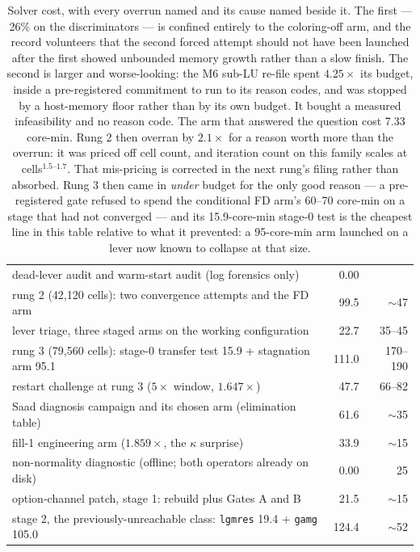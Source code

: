 \documentclass[11pt,a4paper]{article}
\begin{document}
\begin{table}[htbp]
\begin{tabular}{@{}L{7.0cm}rr@{}}
\quad dead-lever audit and warm-start audit (log forensics only) & 0.00 & \\
\quad rung 2 (42{,}120 cells): two convergence attempts and the FD arm & 99.5 & $\sim$47 \\
\quad lever triage, three staged arms on the working configuration & 22.7 & 35--45 \\
\quad rung 3 (79{,}560 cells): stage-0 transfer test 15.9 + stagnation arm 95.1 & 111.0 & 170--190 \\
\quad restart challenge at rung 3 (\(5\times\) window, \(1.647\times\)) & 47.7 & 66--82 \\
\quad Saad diagnosis campaign and its chosen arm (elimination table) & 61.6 & $\sim$35 \\
\quad fill-1 engineering arm (\(1.859\times\), the \(\kappa\) surprise) & 33.9 & $\sim$15 \\
\quad non-normality diagnostic (offline; both operators already on disk) & 0.00 & 25 \\
\quad option-channel patch, stage 1: rebuild plus Gates A and B & 21.5 & $\sim$15 \\
\quad stage 2, the previously-unreachable class: \texttt{lgmres} 19.4 + \texttt{gamg} 105.0 & 124.4 & $\sim$52 \\
\bottomrule
\end{tabular}
\caption{Solver cost, with every overrun named and its cause named beside it. The first --- 26\% on the discriminators --- is confined
entirely
to the coloring-off arm, and the record volunteers that the second forced attempt should not
have been launched after the first showed unbounded memory growth rather than a slow finish.
The second is larger and worse-looking: the M6 sub-LU re-file spent \(4.25\times\) its budget,
inside a pre-registered commitment to run to its reason codes, and was stopped by a host-memory
floor rather than by its own budget. It bought a measured infeasibility and no reason code.
The arm that answered the question cost 7.33 core-min. Rung 2 then overran by
\(2.1\times\) for a reason worth more than the overrun: it was priced off cell count, and
iteration count on this family scales at cells\(^{1.5\text{--}1.7}\). That mis-pricing is
corrected in the next rung's filing rather than absorbed. Rung 3 then came in \emph{under}
budget for the only good reason --- a pre-registered gate refused to spend the conditional FD
arm's 60--70 core-min on a stage that had not converged --- and its 15.9-core-min stage-0 test
is the cheapest line in this table relative to what it prevented: a 95-core-min arm launched on
a lever now known to collapse at that size.
}
\end{table}
\end{document}

